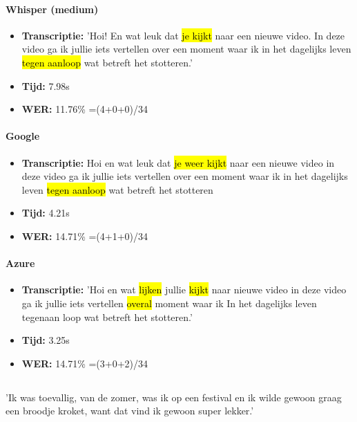 \paragraph{Whisper (medium)}
\begin{itemize}
    \item \textbf{Transcriptie:} 'Hoi! En wat leuk dat \hl{je kijkt} naar een nieuwe video. In deze video ga ik jullie iets vertellen over een moment waar ik in het dagelijks leven \hl{tegen aanloop} wat betreft het stotteren.'
    \item \textbf{Tijd:} 7.98s
    \item \textbf{WER:} 11.76\% =(4+0+0)/34
\end{itemize}

\paragraph{Google}
\begin{itemize}
    \item \textbf{Transcriptie:} Hoi en wat leuk dat \hl{je weer kijkt} naar een nieuwe video in deze video ga ik jullie iets vertellen over een moment waar ik in het dagelijks leven \hl{tegen aanloop} wat betreft het stotteren
    \item \textbf{Tijd:} 4.21s
    \item \textbf{WER:} 14.71\% =(4+1+0)/34
\end{itemize}

\paragraph{Azure}
\begin{itemize}
\item \textbf{Transcriptie:} 'Hoi en wat \hl{lijken }jullie \hl{kijkt} naar nieuwe video in deze video ga ik jullie iets vertellen \hl{overal }moment waar ik In het dagelijks leven tegenaan loop wat betreft het stotteren.'
\item \textbf{Tijd:} 3.25s
\item \textbf{WER:} 14.71\% =(3+0+2)/34
\end{itemize}

\subsection{}%
'Ik was toevallig, van de zomer, was ik op een festival en ik wilde gewoon graag een broodje kroket, want dat vind ik gewoon super lekker.'

